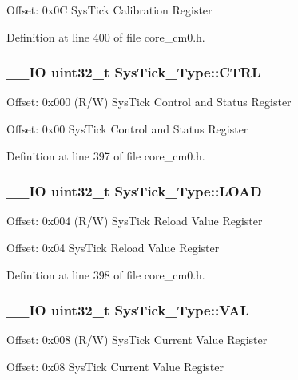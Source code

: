 Offset\-: 0x0\-C Sys\-Tick Calibration Register 

Definition at line 400 of file core\-\_\-cm0.\-h.

\hypertarget{struct_sys_tick___type_af2ad94ac83e5d40fc6e34884bc1bec5f}{
\subsubsection[{C\-T\-R\-L}]{\setlength{\rightskip}{0pt plus 5cm}\-\_\-\-\_\-\-I\-O {\bf uint32\-\_\-t} Sys\-Tick\-\_\-\-Type\-::\-C\-T\-R\-L}}\label{struct_sys_tick___type_af2ad94ac83e5d40fc6e34884bc1bec5f}
Offset\-: 0x000 (R/\-W) Sys\-Tick Control and Status Register

Offset\-: 0x00 Sys\-Tick Control and Status Register 

Definition at line 397 of file core\-\_\-cm0.\-h.

\hypertarget{struct_sys_tick___type_ae7bc9d3eac1147f3bba8d73a8395644f}{
\subsubsection[{L\-O\-A\-D}]{\setlength{\rightskip}{0pt plus 5cm}\-\_\-\-\_\-\-I\-O {\bf uint32\-\_\-t} Sys\-Tick\-\_\-\-Type\-::\-L\-O\-A\-D}}\label{struct_sys_tick___type_ae7bc9d3eac1147f3bba8d73a8395644f}
Offset\-: 0x004 (R/\-W) Sys\-Tick Reload Value Register

Offset\-: 0x04 Sys\-Tick Reload Value Register 

Definition at line 398 of file core\-\_\-cm0.\-h.

\hypertarget{struct_sys_tick___type_a0997ff20f11817f8246e8f0edac6f4e4}{
\subsubsection[{V\-A\-L}]{\setlength{\rightskip}{0pt plus 5cm}\-\_\-\-\_\-\-I\-O {\bf uint32\-\_\-t} Sys\-Tick\-\_\-\-Type\-::\-V\-A\-L}}\label{struct_sys_tick___type_a0997ff20f11817f8246e8f0edac6f4e4}
Offset\-: 0x008 (R/\-W) Sys\-Tick Current Value Register

Offset\-: 0x08 Sys\-Tick Current Value Register 

